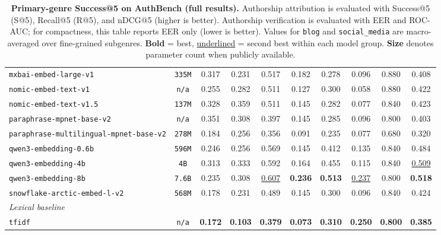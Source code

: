\documentclass{article}
\newcommand{\rev}[1]{#1}
\begin{document}
\begin{table}[htbp]
{\begin{tabular}{lccccccccc}
\texttt{mxbai-embed-large-v1} & \texttt{335M} & 0.317 & 0.231 & 0.517 & 0.182 & 0.278 & 0.096 & 0.880 & 0.408 \\
\texttt{nomic-embed-text-v1} & \texttt{n/a} & 0.255 & 0.282 & 0.511 & 0.127 & 0.300 & 0.058 & 0.880 & 0.422 \\
\texttt{nomic-embed-text-v1.5} & \texttt{137M} & 0.328 & 0.359 & 0.511 & 0.145 & 0.282 & 0.077 & 0.840 & 0.423 \\
\texttt{paraphrase-mpnet-base-v2} & \texttt{n/a} & 0.351 & 0.308 & 0.397 & 0.145 & 0.285 & 0.096 & 0.800 & 0.403 \\
\texttt{paraphrase-multilingual-mpnet-base-v2} & \texttt{278M} & 0.184 & 0.256 & 0.356 & 0.091 & 0.235 & 0.077 & 0.680 & 0.320 \\
\texttt{qwen3-embedding-0.6b} & \texttt{596M} & 0.246 & 0.256 & 0.569 & 0.145 & 0.412 & 0.135 & 0.840 & 0.484 \\
\texttt{qwen3-embedding-4b} & \texttt{4B} & 0.313 & 0.333 & 0.592 & 0.164 & 0.455 & 0.115 & 0.840 & \underline{0.509} \\
\texttt{qwen3-embedding-8b} & \texttt{7.6B} & 0.235 & 0.308 & \underline{0.607} & \textbf{0.236} & \textbf{0.513} & \underline{0.237} & 0.800 & \textbf{0.518} \\
\texttt{snowflake-arctic-embed-l-v2} & \texttt{568M} & 0.178 & 0.231 & 0.489 & 0.145 & 0.300 & 0.096 & 0.840 & 0.424 \\
\midrule
\multicolumn{10}{l}{\textit{Lexical baseline}} \\
\midrule
\texttt{tfidf} & \texttt{n/a} & \textbf{0.172} & \textbf{0.103} & \textbf{0.379} & \textbf{0.073} & \textbf{0.310} & \textbf{0.250} & \textbf{0.800} & \textbf{0.385} \\
\bottomrule
\end{tabular}
}
\caption{\textbf{Primary-genre Success@5 on AuthBench (full results).} Authorship attribution is evaluated with Success@5 (S@5), Recall@5 (R@5), and nDCG@5 (higher is better). \rev{Authorship verification is evaluated with EER and ROC-AUC; for compactness, this table reports EER only (lower is better).} Values for \texttt{blog} and \texttt{social\_media} are macro-averaged over fine-grained subgenres. \textbf{Bold} = best, \underline{underlined} = second best within each model group. \textbf{Size} denotes parameter count when publicly available.}
\label{tab:genre-s5-full}
\end{table}
\end{document}
